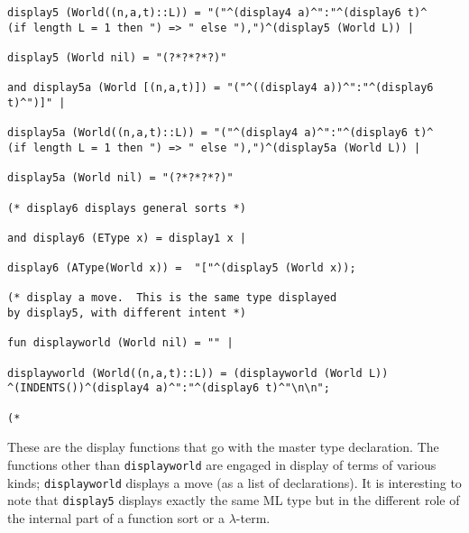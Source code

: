 \documentclass{article}
\begin{document}
\begin{verbatim}
display5 (World((n,a,t)::L)) = "("^(display4 a)^":"^(display6 t)^
(if length L = 1 then ") => " else "),")^(display5 (World L)) |

display5 (World nil) = "(?*?*?*?)"

and display5a (World [(n,a,t)]) = "("^((display4 a))^":"^(display6 t)^")]" |

display5a (World((n,a,t)::L)) = "("^(display4 a)^":"^(display6 t)^
(if length L = 1 then ") => " else "),")^(display5a (World L)) |

display5a (World nil) = "(?*?*?*?)"

(* display6 displays general sorts *)

and display6 (EType x) = display1 x |

display6 (AType(World x)) =  "["^(display5 (World x)); 

(* display a move.  This is the same type displayed
by display5, with different intent *)

fun displayworld (World nil) = "" |

displayworld (World((n,a,t)::L)) = (displayworld (World L))
^(INDENTS())^(display4 a)^":"^(display6 t)^"\n\n";

(*

\end{verbatim}

These are the display functions that go with the master type declaration.  The functions other than {\tt displayworld} are engaged in display of terms of various kinds;
{\tt displayworld} displays a move (as a list of declarations).  It is interesting to note that {\tt display5} displays exactly the same ML type but in the different role of
the internal part of a function sort or a $\lambda$-term.
\end{document}
